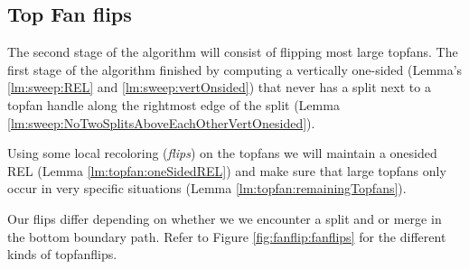 
\subsection{Top Fan flips}
\thispagestyle{plain}
\label{ss:fanflip}

The second stage of the algorithm will consist of flipping most large topfans. The first stage of the algorithm finished by computing a vertically one-sided \rel (Lemma's \ref{lm:sweep:REL} and \ref{lm:sweep:vertOnsided}) that never has a split next to a topfan handle along the rightmost edge of the split (Lemma \ref{lm:sweep:NoTwoSplitsAboveEachOtherVertOnesided}).

Using some local recoloring (\emph{flips}) on the topfans we will maintain a onesided REL (Lemma \ref{lm:topfan:oneSidedREL}) and make sure that large topfans only occur in very specific situations (Lemma \ref{lm:topfan:remainingTopfans}).

Our flips differ depending on whether we we encounter a split and or merge in the bottom boundary path. Refer to Figure \ref{fig:fanflip:fanflips} for the different kinds of topfanflips.


